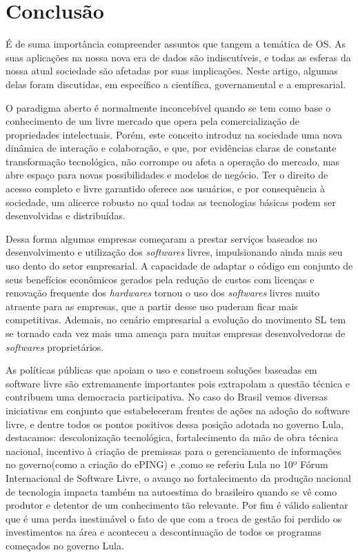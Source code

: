 \documentclass[12pt]{article}
\begin{document}
\newpage

\section{Conclusão}

É de suma importância compreender assuntos que tangem a temática de OS. As suas aplicações na nossa nova era de dados são indiscutíveis, e todas as esferas da nossa atual sociedade são afetadas por suas implicações. Neste artigo, algumas delas foram discutidas, em específico a científica, governamental e a empresarial.

O paradigma aberto é normalmente inconcebível quando se tem como base o conhecimento de um livre mercado que opera pela comercialização de propriedades intelectuais. Porém, este conceito introduz na sociedade uma nova dinâmica de interação e colaboração, e que, por evidências claras de constante transformação tecnológica, não corrompe ou afeta a operação do mercado, mas abre espaço para novas possibilidades e modelos de negócio. Ter o direito de acesso completo e livre garantido oferece aos usuários, e por consequência à sociedade, um alicerce robusto no qual todas as tecnologias básicas podem ser desenvolvidas e distribuídas.

Dessa forma algumas empresas começaram a prestar serviços baseados no desenvolvimento e utilização dos \textit{softwares} livres, impulsionando ainda mais seu uso dento do setor empresarial. A capacidade de adaptar o código em conjunto de seus benefícios econômicos gerados pela redução de custos com licenças e renovação frequente dos \textit{hardwares} tornou o uso dos \textit{softwares} livres muito atraente para as empresas, que a partir desse uso puderam ficar mais competitivas. Ademais, no cenário empresarial a evolução do movimento SL tem se tornado cada vez mais uma ameaça para muitas empresas desenvolvedoras de \textit{softwares} proprietários.

As políticas públicas que apoiam o uso e constroem soluções baseadas em software livre são extremamente importantes pois extrapolam a questão técnica e contribuem uma democracia participativa.
No caso do Brasil vemos diversas iniciativas em conjunto que estabeleceram frentes de ações na adoção do software livre, e dentre todos os pontos positivos dessa posição adotada no governo Lula, destacamos: descolonização tecnológica, fortalecimento da mão de obra técnica nacional, incentivo à criação de premissas para o gerenciamento de informações no governo(como a criação do ePING) e ,como se referiu Lula no 10º Fórum Internacional de Software Livre, o avanço no fortalecimento da produção nacional de tecnologia impacta também na autoestima do brasileiro quando se vê como produtor e detentor de um conhecimento tão relevante. Por fim é válido salientar que é uma perda inestimável o fato de que com a troca de gestão foi perdido os investimentos na área e aconteceu a descontinuação de todos os programas começados no governo Lula.
\newpage
\end{document}

